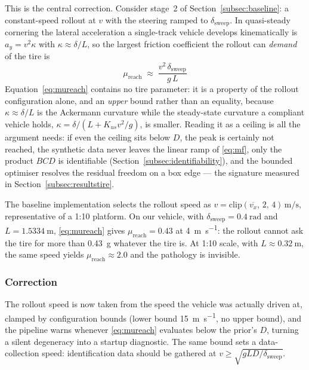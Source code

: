 This is the central correction. Consider stage~2 of
Section~\ref{subsec:baseline}: a constant-speed rollout at $v$ with the
steering ramped to $\delta_{\mathrm{sweep}}$. In quasi-steady cornering the
lateral acceleration a single-track vehicle develops kinematically is
$a_{y}=v^{2}\kappa$ with $\kappa\approx\delta/L$, so the largest friction
coefficient the rollout can \emph{demand} of the tire is
\begin{equation}
\boxed{\;\mu_{\mathrm{reach}}\;\approx\;\frac{v^{2}\,\delta_{\mathrm{sweep}}}{g\,L}\;}
\label{eq:mureach}
\end{equation}
Equation~\eqref{eq:mureach} contains no tire parameter: it is a property of the
rollout configuration alone, and an \emph{upper} bound rather than an equality,
because $\kappa\approx\delta/L$ is the Ackermann curvature while the
steady-state curvature a compliant vehicle holds,
$\kappa=\delta/(L+K_{us}v^{2}/g)$, is smaller. Reading it as a ceiling is all
the argument needs: if even the ceiling sits below $D$, the peak is certainly
not reached, the synthetic data never leaves the linear ramp of \eqref{eq:mf},
only the product $BCD$ is identifiable
(Section~\ref{subsec:identifiability}), and the bounded optimiser resolves the
residual freedom on a box edge --- the signature measured in
Section~\ref{subsec:resultstire}.

The baseline implementation selects the rollout speed as
$v=\mathrm{clip}(\overline{v_{x}},\,2,\,4)\,\si{\meter\per\second}$,
representative of a 1:10 platform. On our vehicle, with
$\delta_{\mathrm{sweep}}=\SI{0.4}{\radian}$ and $L=\SI{1.5334}{\meter}$,
\eqref{eq:mureach} gives $\mu_{\mathrm{reach}}=0.43$ at
\SI{4}{\meter\per\second}: the rollout cannot ask the tire for more than
\SI{0.43}{\g} whatever the tire is. At 1:10 scale, with
$L\approx\SI{0.32}{\meter}$, the same speed yields
$\mu_{\mathrm{reach}}\approx2.0$ and the pathology is invisible.

\subsubsection{Correction}
\label{subsec:rollout}
The rollout speed is now taken from the speed the vehicle was actually driven
at, clamped by configuration bounds (lower bound \SI{15}{\meter\per\second},
no upper bound), and the pipeline warns whenever \eqref{eq:mureach} evaluates
below the prior's $D$, turning a silent degeneracy into a startup diagnostic.
The same bound sets a data-collection speed: identification data should be
gathered at $v\ge\sqrt{gLD/\delta_{\mathrm{sweep}}}$.


